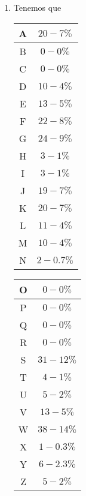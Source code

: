 \documentclass[letterpaper,11pt]{article}
\begin{document}
\begin{enumerate}
\begin{enumerate}
\begin{enumerate}
            \item Tenemos que 
            \begin{center}
                \begin{tabular}{|c|c|}
                \hline
                A & $20-7\%$ \\ \hline
                B & $0-0\%$ \\ \hline
                C & $0-0\%$ \\ \hline
                D & $10-4\%$ \\ \hline
                E & $13-5\%$ \\ \hline
                F & $22-8\%$ \\ \hline
                G & $24-9\%$ \\ \hline
                H & $3-1\%$ \\ \hline
                I & $3-1\%$ \\ \hline
                J & $19-7\%$ \\ \hline
                K & $20-7\%$ \\ \hline
                L & $11-4\%$ \\ \hline
                M & $10-4\%$ \\ \hline
                N & $2-0.7\%$ \\ \hline
                \end{tabular}
            \end{center}

            \begin{center}
                \begin{tabular}{|c|c|}
                    \hline
                    O & $0-0\%$ \\ \hline
                    P & $0-0\%$\\ \hline
                    Q & $0-0\%$ \\ \hline
                    R & $0-0\%$ \\ \hline
                    S & $31-12\%$ \\ \hline
                    T & $4-1\%$ \\ \hline
                    U & $5-2\%$ \\ \hline
                    V & $13-5\%$ \\ \hline
                    W & $38-14\%$ \\ \hline
                    X & $1-0.3\%$ \\ \hline
                    Y & $6-2.3\%$ \\ \hline
                    Z & $5-2\%$ \\ \hline
                \end{tabular}
            \end{center}
        \end{enumerate}


\end{enumerate}
\end{enumerate}
\end{document}
